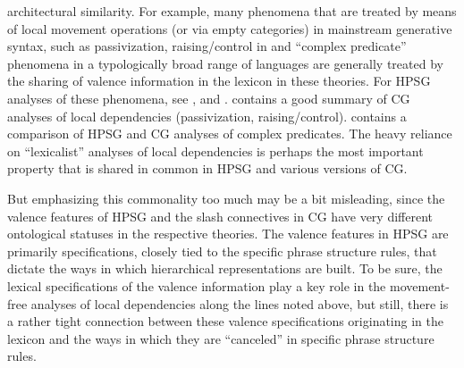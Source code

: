 \documentclass[output=paper
                ,modfonts
 	        ,biblatex
                ,babelshorthands
                ,newtxmath
                ,draftmode
                ,colorlinks, citecolor=brown
]{langscibook}
\begin{document}
architectural similarity. For example, many phenomena that are treated
by means of local movement operations (or via empty categories) in
mainstream generative syntax, such as passivization, raising/control in 
and ``complex predicate'' phenomena in a typologically broad range of
languages are generally treated by the sharing of valence information
in the lexicon in these theories. For HPSG
analyses of these phenomena, see
,  
and .
\citet{steedman2011ccg} contains a good
summary of CG analyses of local dependencies 
(passivization, raising/control). \citet[Section~4.2]{Kubota2014a-u} contains
a comparison of HPSG and CG analyses of complex predicates.
The heavy reliance on ``lexicalist'' analyses of
local dependencies 
is perhaps the most important property that is shared in common in
HPSG and various versions of CG.

But emphasizing this commonality too much may be a bit misleading,
since the valence features of HPSG and the slash connectives in CG
have very different ontological statuses in the respective theories.
The valence features in HPSG are primarily specifications, closely
tied to the specific phrase structure rules, that dictate the ways in
which hierarchical representations are built. To be sure, the lexical
specifications of the valence information play a key role in the
movement-free analyses of local dependencies along the lines noted
above, but still, there is a rather tight connection between these
valence specifications originating in the lexicon and the ways in
which they are ``canceled'' in specific phrase structure rules.
\end{document}
